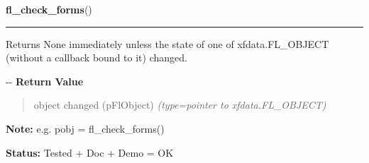    \label{xformslib:flbasic:fl_check_forms}

    \vspace{0.5ex}

\hspace{.8\funcindent}\begin{boxedminipage}{\funcwidth}

    \raggedright \textbf{fl\_check\_forms}()

    \vspace{-1.5ex}

    \rule{\textwidth}{0.5\fboxrule}
\setlength{\parskip}{2ex}

Returns None immediately unless the state of one of xfdata.FL\_OBJECT
(without a callback bound to it) changed.

-{}-
\setlength{\parskip}{1ex}
      \textbf{Return Value}
    \vspace{-1ex}

      \begin{quote}

object changed (pFlObject)
      {\it (type=pointer to xfdata.FL\_OBJECT)}

      \end{quote}

\textbf{Note:} 
e.g. pobj = fl\_check\_forms()


\textbf{Status:} 
Tested + Doc + Demo = OK


    \end{boxedminipage}

    \label{xformslib:flbasic:fl_do_only_forms}

    \vspace{0.5ex}

